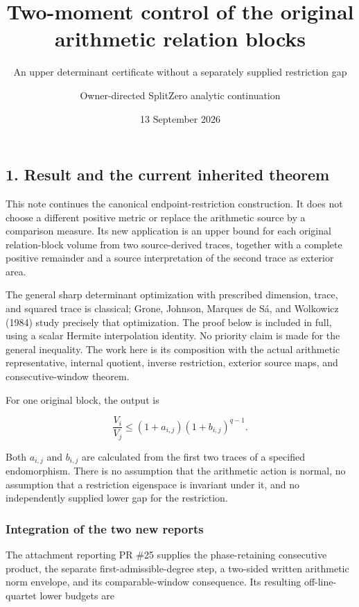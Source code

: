 \documentclass[
  11pt,
]{article}
\title{Two-moment control of the original arithmetic relation blocks}
\subtitle{An upper determinant certificate without a separately supplied
restriction gap}
\author{Owner-directed SplitZero analytic continuation}
\date{13 September 2026}
\begin{document}
\maketitle

{
\setcounter{tocdepth}{3}
\tableofcontents
}
\subsection{1. Result and the current inherited
theorem}\label{result-and-the-current-inherited-theorem}

This note continues the canonical endpoint-restriction construction. It
does not choose a different positive metric or replace the arithmetic
source by a comparison measure. Its new application is an upper bound
for each original relation-block volume from two source-derived traces,
together with a complete positive remainder and a source interpretation
of the second trace as exterior area.

The general sharp determinant optimization with prescribed dimension,
trace, and squared trace is classical; Grone, Johnson, Marques de Sá,
and Wolkowicz (1984) study precisely that optimization. The proof below
is included in full, using a scalar Hermite interpolation identity. No
priority claim is made for the general inequality. The work here is its
composition with the actual arithmetic representative, internal
quotient, inverse restriction, exterior source maps, and
consecutive-window theorem.

For one original block, the output is

\[
 \boxed{\frac{V_i}{V_j}\le(1+a_{i,j})(1+b_{i,j})^{q-1}.}                 \tag{1}
\]

Both \(a_{i,j}\) and \(b_{i,j}\) are calculated from the first two
traces of a specified endomorphism. There is no assumption that the
arithmetic action is normal, no assumption that a restriction eigenspace
is invariant under it, and no independently supplied lower gap for the
restriction.

\subsubsection{Integration of the two new
reports}\label{integration-of-the-two-new-reports}

The attachment reporting PR \#25 supplies the phase-retaining
consecutive product, the separate first-admissible-degree step, a
two-sided written arithmetic norm envelope, and its comparable-window
consequence. Its resulting off-line-quartet lower budgets are
\end{document}
